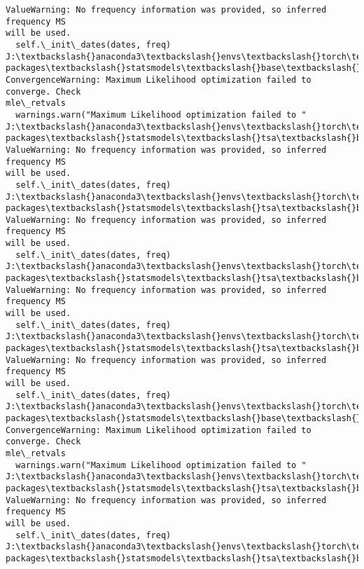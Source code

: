 \documentclass[11pt]{article}
\begin{document}
\begin{Verbatim}[commandchars=\\\{\}]
ValueWarning: No frequency information was provided, so inferred frequency MS
will be used.
  self.\_init\_dates(dates, freq)
J:\textbackslash{}anaconda3\textbackslash{}envs\textbackslash{}torch\textbackslash{}Lib\textbackslash{}site-packages\textbackslash{}statsmodels\textbackslash{}base\textbackslash{}model.py:607:
ConvergenceWarning: Maximum Likelihood optimization failed to converge. Check
mle\_retvals
  warnings.warn("Maximum Likelihood optimization failed to "
J:\textbackslash{}anaconda3\textbackslash{}envs\textbackslash{}torch\textbackslash{}Lib\textbackslash{}site-packages\textbackslash{}statsmodels\textbackslash{}tsa\textbackslash{}base\textbackslash{}tsa\_model.py:473:
ValueWarning: No frequency information was provided, so inferred frequency MS
will be used.
  self.\_init\_dates(dates, freq)
J:\textbackslash{}anaconda3\textbackslash{}envs\textbackslash{}torch\textbackslash{}Lib\textbackslash{}site-packages\textbackslash{}statsmodels\textbackslash{}tsa\textbackslash{}base\textbackslash{}tsa\_model.py:473:
ValueWarning: No frequency information was provided, so inferred frequency MS
will be used.
  self.\_init\_dates(dates, freq)
J:\textbackslash{}anaconda3\textbackslash{}envs\textbackslash{}torch\textbackslash{}Lib\textbackslash{}site-packages\textbackslash{}statsmodels\textbackslash{}tsa\textbackslash{}base\textbackslash{}tsa\_model.py:473:
ValueWarning: No frequency information was provided, so inferred frequency MS
will be used.
  self.\_init\_dates(dates, freq)
J:\textbackslash{}anaconda3\textbackslash{}envs\textbackslash{}torch\textbackslash{}Lib\textbackslash{}site-packages\textbackslash{}statsmodels\textbackslash{}tsa\textbackslash{}base\textbackslash{}tsa\_model.py:473:
ValueWarning: No frequency information was provided, so inferred frequency MS
will be used.
  self.\_init\_dates(dates, freq)
J:\textbackslash{}anaconda3\textbackslash{}envs\textbackslash{}torch\textbackslash{}Lib\textbackslash{}site-packages\textbackslash{}statsmodels\textbackslash{}base\textbackslash{}model.py:607:
ConvergenceWarning: Maximum Likelihood optimization failed to converge. Check
mle\_retvals
  warnings.warn("Maximum Likelihood optimization failed to "
J:\textbackslash{}anaconda3\textbackslash{}envs\textbackslash{}torch\textbackslash{}Lib\textbackslash{}site-packages\textbackslash{}statsmodels\textbackslash{}tsa\textbackslash{}base\textbackslash{}tsa\_model.py:473:
ValueWarning: No frequency information was provided, so inferred frequency MS
will be used.
  self.\_init\_dates(dates, freq)
J:\textbackslash{}anaconda3\textbackslash{}envs\textbackslash{}torch\textbackslash{}Lib\textbackslash{}site-packages\textbackslash{}statsmodels\textbackslash{}tsa\textbackslash{}base\textbackslash{}tsa\_model.py:473:

\end{Verbatim}
\end{document}

